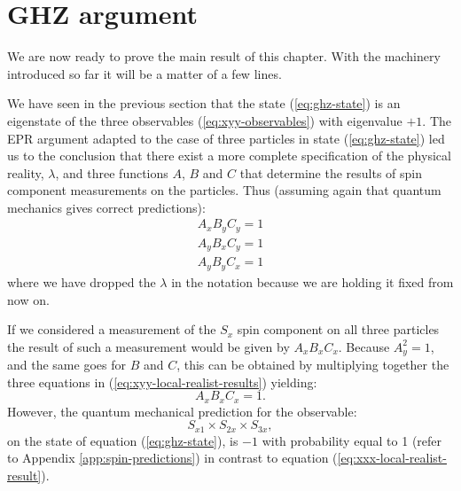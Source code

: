 \section{GHZ argument}
We are now ready to prove the main result of this chapter. With the machinery introduced so far it will be a matter of a few lines.

We have seen in the previous section that the state (\ref{eq:ghz-state}) is an eigenstate of the three observables (\ref{eq:xyy-observables}) with eigenvalue $+ 1$. The EPR argument adapted to the case of three particles in state (\ref{eq:ghz-state}) led us to the conclusion that there exist a more complete specification of the physical reality, $\lambda$, and three functions $A$, $B$ and $C$ that determine the results of spin component measurements on the particles. Thus (assuming again that quantum mechanics gives correct predictions):%
\begin{equation}
  \begin{split}
    A_x B_y C_y = 1\\
    A_y B_x C_y = 1\\
    A_y B_y C_x = 1
  \end{split}
  \label{eq:xyy-local-realist-results}
\end{equation}
where we have dropped the $\lambda$ in the notation because we are holding it fixed from now on.

If we considered a measurement of the $S_x$ spin component on all three particles the result of such a measurement would be given by $A_x B_x C_x$. Because $A_y^2 = 1$, and the same goes for $B$ and $C$, this can be obtained by multiplying together the three equations in (\ref{eq:xyy-local-realist-results}) yielding:
\begin{equation}
  A_x B_x C_x = 1.
  \label{eq:xxx-local-realist-result}
\end{equation}
However, the quantum mechanical prediction for the observable:
\begin{equation}
  S_{x1} \times S_{2x} \times S_{3x},
  \label{eq:xxx-observable}
\end{equation}
on the state of equation (\ref{eq:ghz-state}), is $- 1$ with probability equal to 1 (refer to Appendix \ref{app:spin-predictions}) in contrast to equation (\ref{eq:xxx-local-realist-result}).

